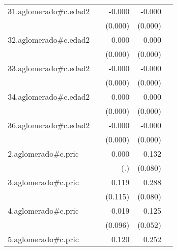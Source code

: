 {\begin{longtable}{l*{4}{D{.}{.}{-1}}}
\addlinespace
31.aglomerado#c.edad2&                     &      -0.000         &      -0.000\sym{***}&                     \\
            &                     &     (0.000)         &     (0.000)         &                     \\
\addlinespace
32.aglomerado#c.edad2&                     &      -0.000\sym{*}  &      -0.000\sym{***}&                     \\
            &                     &     (0.000)         &     (0.000)         &                     \\
\addlinespace
33.aglomerado#c.edad2&                     &      -0.000         &      -0.000\sym{***}&                     \\
            &                     &     (0.000)         &     (0.000)         &                     \\
\addlinespace
34.aglomerado#c.edad2&                     &      -0.000         &      -0.000\sym{***}&                     \\
            &                     &     (0.000)         &     (0.000)         &                     \\
\addlinespace
36.aglomerado#c.edad2&                     &      -0.000         &      -0.000         &                     \\
            &                     &     (0.000)         &     (0.000)         &                     \\
\addlinespace
2.aglomerado#c.pric&                     &       0.000         &       0.132         &                     \\
            &                     &         (.)         &     (0.080)         &                     \\
\addlinespace
3.aglomerado#c.pric&                     &       0.119         &       0.288\sym{***}&                     \\
            &                     &     (0.115)         &     (0.080)         &                     \\
\addlinespace
4.aglomerado#c.pric&                     &      -0.019         &       0.125\sym{*}  &                     \\
            &                     &     (0.096)         &     (0.052)         &                     \\
\addlinespace
5.aglomerado#c.pric&                     &       0.120         &       0.252\sym{**} &                     \\

\end{longtable}}
